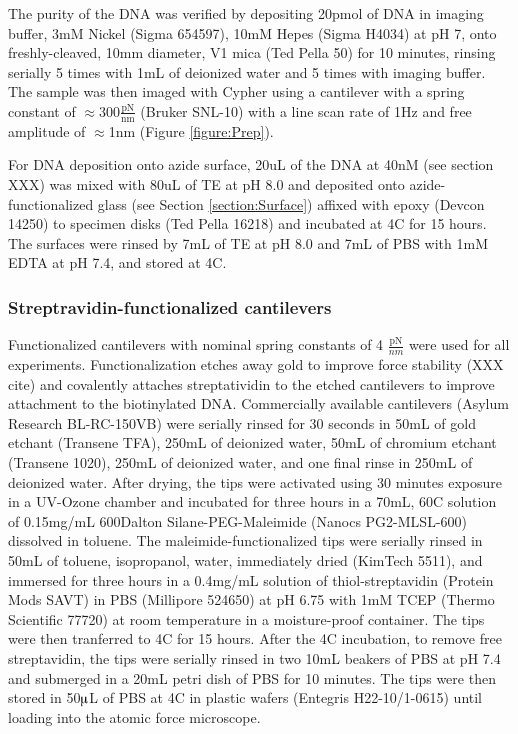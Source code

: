 \documentclass[%
  aip,12pt,tightenlines,
  amsthm,
 amsmath,amssymb
]{article}
\newcommand{\fRef}[1]{Figure \ref{figure:#1}}
\newcommand{\sRef}[1]{Section \ref{section:#1}}
\newcommand{\sLabel}[1]{\label{section:#1}}
\newcommand{\firstp}[0]{}
\newcommand{\pl}[0]{\vspace{6pt}}
\newcommand{\supply}[2]{(#1 #2)}
\newcommand{\degreeC}[0]{\degree{}C}
\begin{document}
The purity of the DNA was verified by depositing 20pmol of DNA in imaging buffer, 3mM Nickel \supply{Sigma}{654597}, 10mM Hepes \supply{Sigma}{H4034} at pH 7, onto freshly-cleaved, 10mm diameter, V1 mica \supply{Ted Pella}{50} for 10 minutes, rinsing serially 5 times with 1mL of deionized water and 5 times with imaging buffer. The sample was then imaged with Cypher using a cantilever with a spring constant of $\approx 300 \frac{\text{pN}}{\text{nm}}$ \supply{Bruker}{SNL-10} with a line scan rate of 1Hz and free amplitude of $\approx$1nm (\fRef{Prep}).\pl 

For DNA deposition onto azide surface, 20uL of the DNA at 40nM (see section XXX) was mixed with 80uL of TE at pH 8.0 and deposited onto azide-functionalized glass (see \sRef{Surface}) affixed with epoxy \supply{Devcon}{14250} to specimen disks \supply{Ted Pella}{16218} and incubated at 4C for 15 hours. The surfaces were rinsed by 7mL of TE at pH 8.0 and 7mL of PBS with 1mM EDTA at pH 7.4, and stored at 4\degreeC{}. 

\subsubsection{\sLabel{Cantilevers}Streptravidin-functionalized cantilevers}

\firstp Functionalized cantilevers with nominal spring constants of 4 $\frac{\text{pN}}{nm}$  were used for all experiments. Functionalization etches away gold to improve force stability (XXX cite) and covalently attaches streptatividin to the etched cantilevers to improve attachment to the biotinylated DNA. Commercially available cantilevers \supply{Asylum Research}{BL-RC-150VB} were serially rinsed for 30 seconds in 50mL of gold etchant \supply{Transene}{TFA}, 250mL of deionized water, 50mL of chromium etchant \supply{Transene}{1020}, 250mL of deionized water, and one final rinse in 250mL of deionized water. After drying, the tips were activated using 30 minutes exposure in a UV-Ozone chamber and incubated for three hours in a 70mL, 60\degreeC{} solution of 0.15mg/mL 600Dalton Silane-PEG-Maleimide \supply{Nanocs}{PG2-MLSL-600} dissolved in toluene. The maleimide-functionalized tips were serially rinsed in 50mL of toluene, isopropanol, water, immediately dried \supply{KimTech}{5511}, and immersed for three hours in a 0.4mg/mL solution of thiol-streptavidin \supply{Protein Mods}{SAVT} in PBS \supply{Millipore}{524650} at pH 6.75 with 1mM TCEP \supply{Thermo Scientific}{77720} at room temperature in a moisture-proof container. The tips were then tranferred to 4\degreeC{} for 15 hours. After the 4\degreeC{} incubation, to remove free streptavidin, the tips were serially rinsed in two 10mL beakers of PBS at pH 7.4 and submerged in a 20mL petri dish of PBS for 10 minutes. The tips were then stored in 50$\muup$L of PBS at 4C in plastic wafers \supply{Entegris}{H22-10/1-0615} until loading into the atomic force microscope. \pl
\end{document}
